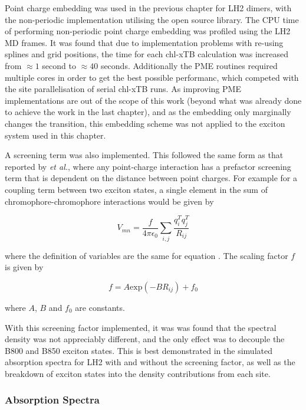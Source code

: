 Point charge embedding was used in the previous chapter for LH2 dimers, with the
non-periodic implementation utilising the open source  library. The
CPU time of performing non-periodic point charge embedding was profiled using the
LH2 MD frames. It was found that due to implementation problems with re-using splines
and grid positions, the time for each chl-xTB calculation was increased from $\approx 1$
second to  $\approx 40$ seconds. Additionally the PME routines required multiple 
cores in order to get the best possible performanc, which competed with the site 
parallelisation of serial chl-xTB runs. As improving PME implementations are out
of the scope of this work (beyond what was already done to achieve the work in the
last chapter), and as the embedding only marginally changes the \Qy transition,
this embedding scheme was not applied to the exciton system used in this chapter.

A screening term was also implemented. This followed the same form as that reported
by \emph{et al.}, where any point-charge interaction has a prefactor screening term
that is dependent on the distance between point charges. For example for a coupling
term between two exciton states, a single element in the sum of chromophore-chromophore
interactions would be given by

\begin{equation}
    V_{mn} = \frac{f}{4\pi\epsilon_0} \sum_{i,j} \frac{q^T_i q^T_j}{R_{ij}}
\end{equation}

where the definition of variables are the same for equation . The scaling factor 
$f$ is given by

\begin{equation}
    f = A \text{exp}\left(-B R_{ij}\right) + f_0
\end{equation}

where $A$, $B$ and $f_0$ are constants. 

With this screening factor implemented, it was was found that the spectral density
was not appreciably different, and the only effect  was to decouple the B800 and
B850 exciton states. This is best demonstrated in the simulated absorption spectra 
for LH2 with and without the screening factor, as well as the breakdown of exciton
states into the density contributions from each site.

\subsubsection{Absorption Spectra}
\label{subsubsec:abs_spec}

